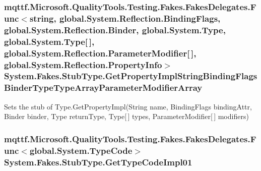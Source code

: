 \hypertarget{class_system_1_1_fakes_1_1_stub_type_af986d4c52b460bf6c64e8ca14277f632}{
\subsubsection[{Get\-Property\-Impl\-String\-Binding\-Flags\-Binder\-Type\-Type\-Array\-Parameter\-Modifier\-Array}]{\setlength{\rightskip}{0pt plus 5cm}mqttf.\-Microsoft.\-Quality\-Tools.\-Testing.\-Fakes.\-Fakes\-Delegates.\-Func$<$string, global.\-System.\-Reflection.\-Binding\-Flags, global.\-System.\-Reflection.\-Binder, global.\-System.\-Type, global.\-System.\-Type\mbox{[}$\,$\mbox{]}, global.\-System.\-Reflection.\-Parameter\-Modifier\mbox{[}$\,$\mbox{]}, global.\-System.\-Reflection.\-Property\-Info$>$ System.\-Fakes.\-Stub\-Type.\-Get\-Property\-Impl\-String\-Binding\-Flags\-Binder\-Type\-Type\-Array\-Parameter\-Modifier\-Array}}\label{class_system_1_1_fakes_1_1_stub_type_af986d4c52b460bf6c64e8ca14277f632}


Sets the stub of Type.\-Get\-Property\-Impl(\-String name, Binding\-Flags binding\-Attr, Binder binder, Type return\-Type, Type\mbox{[}$\,$\mbox{]} types, Parameter\-Modifier\mbox{[}$\,$\mbox{]} modifiers)

\hypertarget{class_system_1_1_fakes_1_1_stub_type_a59454429b4ec4a8b5ea7b76580b0de87}{
\subsubsection[{Get\-Type\-Code\-Impl01}]{\setlength{\rightskip}{0pt plus 5cm}mqttf.\-Microsoft.\-Quality\-Tools.\-Testing.\-Fakes.\-Fakes\-Delegates.\-Func$<$global.\-System.\-Type\-Code$>$ System.\-Fakes.\-Stub\-Type.\-Get\-Type\-Code\-Impl01}}\label{class_system_1_1_fakes_1_1_stub_type_a59454429b4ec4a8b5ea7b76580b0de87}


